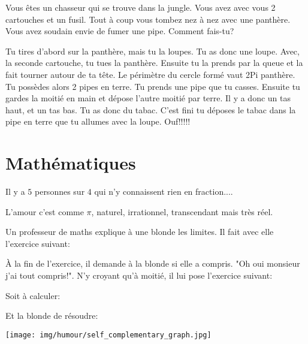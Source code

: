 Vous êtes un chasseur qui se trouve dans la jungle. Vous avez avec vous 2 cartouches et un fusil. Tout à coup vous tombez nez à nez avec une panthère. Vous avez soudain envie de fumer une pipe. Comment fais-tu?

Tu tires d'abord sur la panthère, mais tu la loupes. Tu as donc une loupe. Avec, la seconde cartouche, tu tues la panthère. Ensuite tu la prends par la queue et la fait tourner autour de ta tête. Le périmètre du cercle formé vaut 2Pi panthère. Tu possèdes alors 2 pipes en terre. Tu prends une pipe que tu casses. Ensuite tu gardes la moitié en main et dépose l'autre moitié par terre. Il y a donc un tas haut, et un tas bas. Tu as donc du tabac. C'est fini tu déposes le tabac dans la pipe en terre que tu allumes avec la loupe. Ouf!!!!!

	\pagebreak
	\section{Mathématiques}

Il y a $5$ personnes sur $4$ qui n'y connaissent rien en fraction....

	\begin{center}\underline{\hspace{5 cm}}\end{center}

L'amour c'est comme $\pi$, naturel, irrationnel, transcendant mais très réel.

	\begin{center}\underline{\hspace{5 cm}}\end{center}

Un professeur de maths explique à une blonde les limites. Il fait avec elle l'exercice suivant:
	
	À la fin de l'exercice, il demande à la blonde si elle a compris. "Oh oui monsieur j'ai tout compris!". N'y croyant qu'à moitié, il lui pose l'exercice suivant:

	Soit à calculer:
	
	Et la blonde de résoudre:
	
	
	\begin{center}\underline{\hspace{5 cm}}\end{center}
	
	\begin{center}
		\texttt{[image: img/humour/self\_complementary\_graph.jpg]}	
	\end{center}
	

